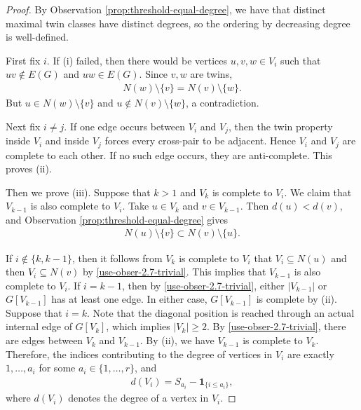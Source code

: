 \documentclass[10pt,a4paper]{article}
\newcommand{\ind}{\mathbf 1}
\begin{document}
\begin{proof}
By Observation \ref{prop:threshold-equal-degree}, we have that distinct maximal twin classes
have distinct degrees, so the ordering by decreasing degree is well-defined.

First fix $i$.  If (i) failed, then there would be vertices
$u,v,w\in V_i$ such that $uv\notin E(G)$ and $uw\in E(G)$.  Since $v,w$ are twins, 
\begin{align*}
  N(w)\setminus\{v\}=N(v)\setminus\{w\}.
\end{align*}
But $u\in N(w)\setminus\{v\}$ and $u\notin N(v)\setminus\{w\}$, a
contradiction. 

Next fix $i\ne j$.  If one edge occurs between $V_i$ and $V_j$, then the twin property inside $V_i$ and inside $V_j$ forces every cross-pair to be adjacent.  Hence $V_i$ and $V_j$ are complete to each other.  If no such edge occurs, they are anti-complete.  This proves (ii).

Then we  prove (iii). Suppose that $k>1$ and $V_k$ is complete to $V_i$.  We claim that
$V_{k-1}$ is also complete to $V_i$.  Take $u\in V_k$ and $v\in V_{k-1}$.  Then $d(u)<d(v)$, and Observation \ref{prop:threshold-equal-degree} gives
\begin{align}\label{use-obser-2.7-trivial}
  N(u)\setminus\{v\}\subset N(v)\setminus\{u\}.
\end{align}


If $i\notin \{k,k-1\}$, then it follows from $V_k$ is complete to $V_i$ that $V_i\subseteq N(u)$ and then  $V_i\subseteq N(v)$ by \eqref{use-obser-2.7-trivial}. This implies that  $V_{k-1}$ is also complete to $V_i$.
If $i=k-1$, then by \eqref{use-obser-2.7-trivial}, either $|V_{k-1}|$ or $G[V_{k-1}]$ has at least one edge. In either case, $G[V_{k-1}]$ is complete by (ii). Suppose that  $i=k$.  Note that the diagonal position is reached through an actual internal edge of $G[V_k]$, which implies  $|V_k|\ge 2$. By  \eqref{use-obser-2.7-trivial}, there are edges between $V_k$ and $V_{k-1}$. By (ii), we have $V_{k-1}$ is  complete to $V_k$. Therefore, 
the indices contributing to the degree of vertices in $V_i$ are exactly
$1,\ldots,a_i$ for some $a_i\in\{1,\ldots,r\}$, and
\begin{align*}
  d(V_i)=S_{a_i}-\ind_{\{i\le a_i\}}, 
\end{align*}
where $d(V_i)$ denotes the degree of a vertex in $V_i$. 










\end{proof}
\end{document}
